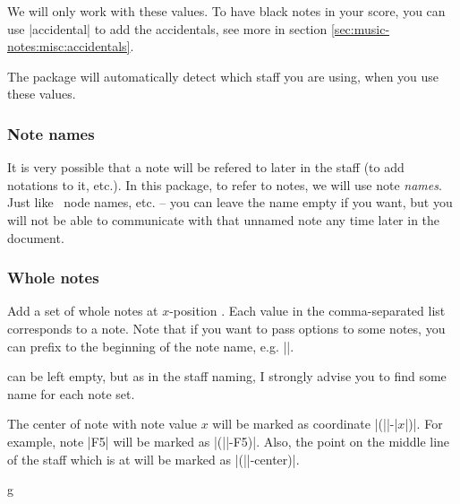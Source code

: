We will only work with these values. To have black notes in your score, you can 
use |accidental| to add the accidentals, see more in section \ref{sec:music-notes:misc:accidentals}.

The package will automatically detect which staff you are using, when you use 
these values.
\subsubsection{Note names}\label{sec:music-notes:commands:note-names}
It is very possible that a note will be refered to later in the staff (to add 
notations to it, etc.). In this package, to refer to notes, we will use note 
\emph{names}. Just like \tikzname\ node names, etc. -- you can leave the name 
empty if you want, but you will not be able to communicate with that unnamed note 
any time later in the document.
\subsubsection{Whole notes}\label{sec:music-notes:commands:whole}
\begin{command}{\tmwhole{}}
  Add a set of whole notes at $x$-position . Each value in the 
  comma-separated list  corresponds to a note. Note that 
  if you want to pass options to some notes, you can prefix  to the 
  beginning of the note name, e.g. ||.

   can be left empty, but as in the staff naming, I strongly advise 
  you to find some name for each note set.

  The center of note with note value $x$ will be marked as coordinate 
  |(||-|$x$|)|. For example, note |F5| will be marked as 
  |(||-F5)|. Also, the point on the middle line of the staff which is 
  at  will be marked as |(||-center)|.
\end{command}
\begin{codeexample}[]
\begin{tmline}
\begin{tmstaff}{g}{}
\end{tmstaff}
\end{tmline}
\end{codeexample}
